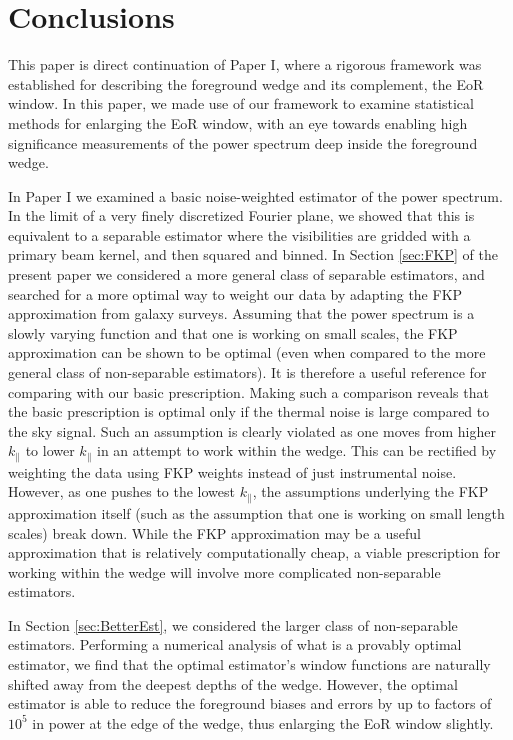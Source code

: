 \documentclass[twocolumn,aps,prd,nofootinbib,showpacs]{revtex4-1}
\begin{document}
\section{Conclusions}
\label{sec:Conclusions}
This paper is direct continuation of Paper I, where a rigorous framework was established for describing the foreground wedge and its complement, the EoR window.  In this paper, we made use of our framework to examine statistical methods for enlarging the EoR window, with an eye towards enabling high significance measurements of the power spectrum deep inside the foreground wedge.

In Paper I we examined a basic noise-weighted estimator of the power spectrum.  In the limit of a very finely discretized Fourier plane, we showed that this is equivalent to a separable estimator where the visibilities are gridded with a primary beam kernel, and then squared and binned.  In Section \ref{sec:FKP} of the present paper we considered a more general class of separable estimators, and searched for a more optimal way to weight our data by adapting the FKP approximation from galaxy surveys.  Assuming that the power spectrum is a slowly varying function and that one is working on small scales, the FKP approximation can be shown to be optimal (even when compared to the more general class of non-separable estimators).  It is therefore a useful reference for comparing with our basic prescription.  Making such a comparison reveals that the basic prescription is optimal only if the thermal noise is large compared to the sky signal.  Such an assumption is clearly violated as one moves from higher $k_\parallel$ to lower $k_\parallel$ in an attempt to work within the wedge.  This can be rectified by weighting the data using FKP weights instead of just instrumental noise.  However, as one pushes to the lowest $k_\parallel$, the assumptions underlying the FKP approximation itself (such as the assumption that one is working on small length scales) break down.  While the FKP approximation may be a useful approximation that is relatively computationally cheap, a viable prescription for working within the wedge will involve more complicated non-separable estimators.

In Section \ref{sec:BetterEst}, we considered the larger class of non-separable estimators.  Performing a numerical analysis of what is a provably optimal estimator, we find that the optimal estimator's window functions are naturally shifted away from the deepest depths of the wedge.  However, the optimal estimator is able to reduce the foreground biases and errors by up to factors of $10^5$ in power at the edge of the wedge, thus enlarging the EoR window slightly.
\end{document}
